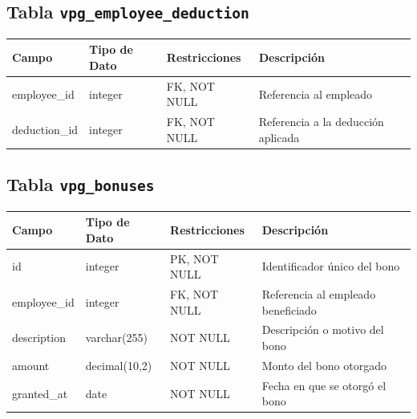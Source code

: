\begin{center}
	\subsection{Tabla \texttt{vpg\_employee\_deduction}}
	\small
	\begin{tabular}{|l|l|l|p{6cm}|}
		\hline
		\textbf{Campo} & \textbf{Tipo de Dato} & \textbf{Restricciones} & \textbf{Descripción}               \\
		\hline
		employee\_id   & integer               & FK, NOT NULL           & Referencia al empleado             \\
		deduction\_id  & integer               & FK, NOT NULL           & Referencia a la deducción aplicada \\
		\hline
	\end{tabular}
	\normalsize

	\subsection{Tabla \texttt{vpg\_bonuses}}
	\small
	\begin{tabular}{|l|l|l|p{6cm}|}
		\hline
		\textbf{Campo} & \textbf{Tipo de Dato} & \textbf{Restricciones} & \textbf{Descripción}               \\
		\hline
		id             & integer               & PK, NOT NULL           & Identificador único del bono       \\
		employee\_id   & integer               & FK, NOT NULL           & Referencia al empleado beneficiado \\
		description    & varchar(255)          & NOT NULL               & Descripción o motivo del bono      \\
		amount         & decimal(10,2)         & NOT NULL               & Monto del bono otorgado            \\
		granted\_at    & date                  & NOT NULL               & Fecha en que se otorgó el bono     \\
		\hline
	\end{tabular}
	\normalsize
\end{center}

